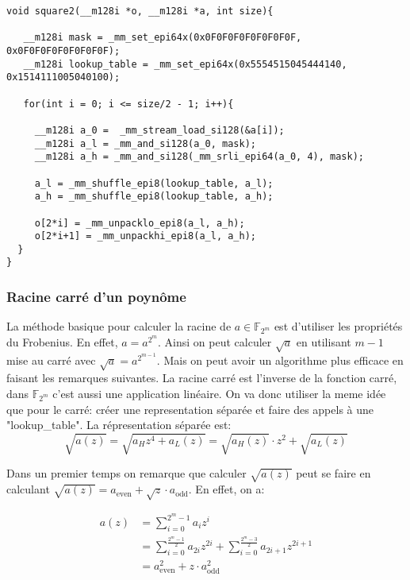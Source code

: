 \documentclass[12pt]{article}
\begin{document}
\begin{lstlisting}[style = Cstyle]
void square2(__m128i *o, __m128i *a, int size){

   __m128i mask = _mm_set_epi64x(0x0F0F0F0F0F0F0F0F, 0x0F0F0F0F0F0F0F0F);
   __m128i lookup_table = _mm_set_epi64x(0x5554515045444140, 0x1514111005040100);

   for(int i = 0; i <= size/2 - 1; i++){

     __m128i a_0 =  _mm_stream_load_si128(&a[i]);
     __m128i a_l = _mm_and_si128(a_0, mask);
     __m128i a_h = _mm_and_si128(_mm_srli_epi64(a_0, 4), mask);

     a_l = _mm_shuffle_epi8(lookup_table, a_l);
     a_h = _mm_shuffle_epi8(lookup_table, a_h);

     o[2*i] = _mm_unpacklo_epi8(a_l, a_h);
     o[2*i+1] = _mm_unpackhi_epi8(a_l, a_h);
  }
}
\end{lstlisting}

\subsubsection{Racine carré d'un poynôme}
La méthode basique pour calculer la racine de $a \in \mathbb{F}_{2^m}$ est d'utiliser les propriétés du Frobenius. En effet, $a = a^{2^m}$. Ainsi on peut calculer $\sqrt{a}$ en utilisant $m-1$ mise au carré avec $\sqrt{a} = a ^{2^{m-1}}$. Mais on peut avoir un algorithme plus efficace en faisant les remarques suivantes. La racine carré est l'inverse de la fonction carré, dans $\mathbb{F}_{2^m}$ c'est aussi une application linéaire. On va donc utiliser la meme idée que pour le carré: créer une representation séparée et faire des appels à une "lookup\_table".
\newline La répresentation séparée est:
\begin{equation}
\label{split/root/l-h}
\sqrt{a(z)} = \sqrt{a_Hz^4 + a_L(z)} = \sqrt{a_H(z)} \cdot z^2 + \sqrt{a_L(z)}
\end{equation}


Dans un premier temps on remarque que calculer $\sqrt{a(z)}$ peut se faire en calculant $\sqrt{a(z)}=a_{\text{even}} + \sqrt{z} \cdot a_{\text{odd}}$. En effet, on a:

\begin{align*}
    a(z) &= \sum_{i=0}^{2^m - 1}a_i z^i \\
        &= \sum_{i=0}^{\frac{2^m - 1}{2}}a_{2i}z^{2i} + \sum_{i=0}^{\frac{2^m - 3}{2}}a_{2i+1}z^{2i+1} \\
        &= a_{\text{even}}^2 +z \cdot a_{\text{odd}}^2
\end{align*}
\end{document}
